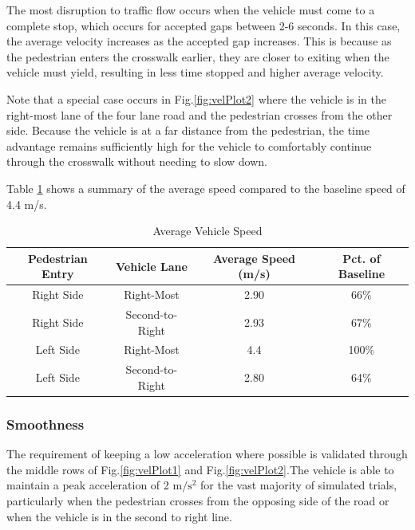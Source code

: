 \documentclass[letterpaper, 10 pt, conference]{ieeeconf}  %
\begin{document}
The most disruption to traffic flow occurs when the vehicle must come to a complete stop, which occurs for accepted gaps between 2-6 seconds. In this case, the average velocity increases as the accepted gap increases. This is because as the pedestrian enters the crosswalk earlier, they are closer to exiting when the vehicle must yield, resulting in less time stopped and higher average velocity. 

Note that a special case occurs in Fig.\ref{fig:velPlot2} where the vehicle is in the right-most lane of the four lane road and the pedestrian crosses from the other side. Because the vehicle is at a far distance from the pedestrian, the time advantage remains sufficiently high for the vehicle to comfortably continue through the crosswalk without needing to slow down. 

Table \ref{tb:speeds} shows a summary of the average speed compared to the baseline speed of 4.4 m/s.

\begin{table}[h]
\footnotesize
\begin{center}
\caption{Average Vehicle Speed}\label{tb:speeds}
\begin{tabular}{cccc}
Pedestrian Entry & Vehicle Lane & Average Speed (m/s) & Pct. of Baseline \\\hline\hline

Right Side & Right-Most & 2.90 & 66\% \\
Right Side & Second-to-Right & 2.93 & 67\% \\
Left Side  & Right-Most & 4.4 & 100\% \\
Left Side  & Second-to-Right & 2.80 & 64\% \\\hline

\end{tabular}
\end{center}
\end{table}

\subsubsection{Smoothness}
The requirement of keeping a low acceleration where possible is validated through the middle rows of Fig.\ref{fig:velPlot1} and Fig.\ref{fig:velPlot2}.The vehicle is able to maintain a peak acceleration of 2 $\mathrm{m/s^2}$ for the vast majority of simulated trials, particularly when the pedestrian crosses from the opposing side of the road or when the vehicle is in the second to right line.
\end{document}
